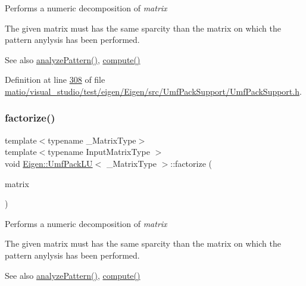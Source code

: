 Performs a numeric decomposition of {\itshape matrix} 

The given matrix must has the same sparcity than the matrix on which the pattern anylysis has been performed.

\begin{DoxySeeAlso}{See also}
\hyperlink{class_eigen_1_1_umf_pack_l_u_ac7ea28b2017d6b26b7b08497f294e5e6}{analyze\+Pattern()}, \hyperlink{class_eigen_1_1_umf_pack_l_u_a05fb2b5717ebd67e46b83439721ceee7}{compute()} 
\end{DoxySeeAlso}


Definition at line \hyperlink{matio_2visual__studio_2test_2eigen_2_eigen_2src_2_umf_pack_support_2_umf_pack_support_8h_source_l00308}{308} of file \hyperlink{matio_2visual__studio_2test_2eigen_2_eigen_2src_2_umf_pack_support_2_umf_pack_support_8h_source}{matio/visual\+\_\+studio/test/eigen/\+Eigen/src/\+Umf\+Pack\+Support/\+Umf\+Pack\+Support.\+h}.

\mbox{\label{class_eigen_1_1_umf_pack_l_u_a1471bf890503e743c45d75cc02a5345d}} 
\subsubsection{\texorpdfstring{factorize()}{factorize()}\hspace{0.1cm}{\footnotesize\ttfamily [2/2]}}
{\footnotesize\ttfamily template$<$typename \+\_\+\+Matrix\+Type$>$ \\
template$<$typename Input\+Matrix\+Type $>$ \\
void \hyperlink{class_eigen_1_1_umf_pack_l_u}{Eigen\+::\+Umf\+Pack\+LU}$<$ \+\_\+\+Matrix\+Type $>$\+::factorize (\begin{DoxyParamCaption}\item[{const Input\+Matrix\+Type \&}]{matrix }\end{DoxyParamCaption})\hspace{0.3cm}{\ttfamily [inline]}}

Performs a numeric decomposition of {\itshape matrix} 

The given matrix must has the same sparcity than the matrix on which the pattern anylysis has been performed.

\begin{DoxySeeAlso}{See also}
\hyperlink{class_eigen_1_1_umf_pack_l_u_ac7ea28b2017d6b26b7b08497f294e5e6}{analyze\+Pattern()}, \hyperlink{class_eigen_1_1_umf_pack_l_u_a05fb2b5717ebd67e46b83439721ceee7}{compute()} 
\end{DoxySeeAlso}


